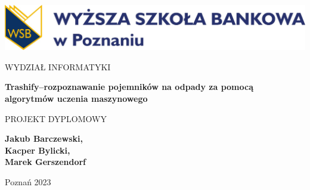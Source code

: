 \documentclass[12pt, oneside, a4paper]{book}
\newcommand{\department}{Wydział Informatyki}
\newcommand{\topic}{Trashify–rozpoznawanie pojemników na odpady za pomocą algorytmów uczenia maszynowego}
\begin{document}
\pagestyle{fancy}
\fancyfoot[C]{\thepage}
\begin{titlepage}
    \begin{center}

        \includegraphics[width=1\textwidth]{wsb-logo.png}

        \MakeUppercase{\department}

        \vspace*{1cm}

        \textbf{\topic}

        PROJEKT DYPLOMOWY

        \vspace*{1.5cm}
        \textbf{Jakub Barczewski,\\ Kacper Bylicki,\\ Marek Gerszendorf}

        \vfill
        Poznań 2023

    \end{center}
\end{titlepage}
\end{document}
